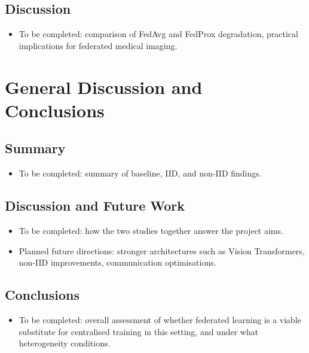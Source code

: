 \documentclass[12pt,openany,a4paper]{book}
\begin{document}
\section{Discussion}
\begin{itemize}
  \item To be completed: comparison of FedAvg and FedProx degradation, practical implications for federated medical imaging.
\end{itemize}

\chapter{General Discussion and Conclusions}
\section{Summary}
\begin{itemize}
  \item To be completed: summary of baseline, IID, and non-IID findings.
\end{itemize}
\section{Discussion and Future Work}
\begin{itemize}
  \item To be completed: how the two studies together answer the project aims.
  \item Planned future directions: stronger architectures such as Vision Transformers, non-IID improvements, communication optimisations.
\end{itemize}
\section{Conclusions}
\begin{itemize}
  \item To be completed: overall assessment of whether federated learning is a viable substitute for centralised training in this setting, and under what heterogeneity conditions.
\end{itemize}

\cleardoublepage




\appendix

\end{document}
